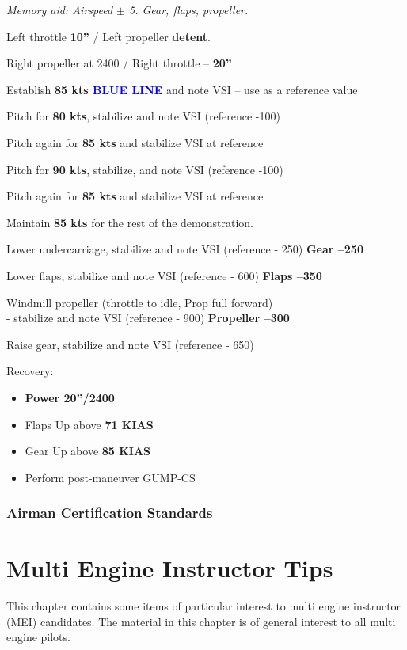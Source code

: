 {\emph{Memory aid: Airspeed $\pm$ 5. Gear, flaps, propeller.}

Left throttle \textbf{10''} / Left propeller \textbf{detent}.

Right propeller at 2400 / Right throttle – \textbf{20''}

Establish \vyse \textbf{85 kts \textcolor{blue}{BLUE LINE}} and note VSI – use as a reference value

Pitch for \textbf{80 kts}, stabilize and note VSI (reference -100)

Pitch again for \textbf{85 kts} and stabilize VSI at reference

Pitch for \textbf{90 kts}, stabilize, and note VSI (reference -100)

Pitch again for \textbf{85 kts} and stabilize VSI at reference

Maintain \textbf{85 kts} for the rest of the demonstration.

Lower undercarriage, stabilize and note VSI (reference - 250) \textbf{Gear –250}

Lower flaps, stabilize and note VSI (reference - 600) \textbf{Flaps –350}

Windmill propeller (throttle to idle, Prop full forward)\\
- stabilize and note VSI (reference - 900) \textbf{Propeller –300}

Raise gear, stabilize and note VSI (reference - 650)

Recovery:
\begin{itemize}[label={}]

\item \textbf{Power 20''/2400}
\item Flaps Up above \textbf{71 KIAS}
\item Gear Up above \textbf{85 KIAS}
\item Perform post-maneuver GUMP-CS
\end{itemize}

\subsection{Airman Certification Standards}
\newpage


\chapter{Multi Engine Instructor Tips}

This chapter contains some items of particular interest to multi engine instructor (MEI) candidates.
The material in this chapter is of general interest to all multi engine pilots.

}
